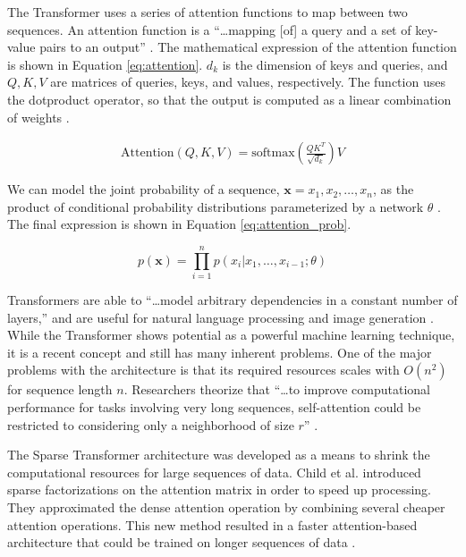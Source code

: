 \documentclass[letterpaper]{article} %
\begin{document}
The Transformer uses a series of attention functions to map
between two sequences.
An attention function is a
``\dots mapping [of] a query and a
set of key-value pairs to an output''
\cite{attention_need}.
The mathematical expression of the attention function is shown in
Equation \ref{eq:attention}.
$d_k$ is the dimension of keys and queries, and
$Q,K,V$ are matrices of queries, keys, and values, respectively.
The function uses the dotproduct operator, so that the output is computed as
a linear combination of weights
\cite{attention_need}.

\begin{equation}
\label{eq:attention}
\begin{split}
\text{Attention}(Q,K,V) = \text{softmax}(\frac{QK^T}{\sqrt{d_k}})V
\end{split}
\end{equation}

We can model the joint probability of a sequence,
$\mathbf{x}={x_1,x_2,\dots,x_n}$,
as the product of conditional
probability distributions parameterized by a network $\theta$
\cite{generative_transformers}.
The final expression is shown in Equation \ref{eq:attention_prob}.

\begin{equation}
\label{eq:attention_prob}
p(\mathbf{x}) = \prod_{i=1}^{n}p(x_i|x_1,\dots,x_{i-1};\theta)
\end{equation}

Transformers are able to
``\dots model arbitrary dependencies
in a constant number of layers,''
and are useful for natural language processing and image generation
\cite{generative_transformers}.
While the Transformer shows potential as a powerful machine learning technique,
it is a recent concept and still has many inherent problems.
One of the major problems with the architecture
is that its required resources scales with $O(n^2)$
for sequence length $n$. Researchers theorize that
``\dots to improve computational performance for tasks involving very long sequences,
self-attention could be restricted to considering only a neighborhood of size $r$''
\cite{attention_need}.

The Sparse Transformer architecture was developed as a means to shrink the
computational resources for large sequences of data.
Child et al. introduced sparse factorizations on the attention matrix
in order to speed up processing.
They approximated the dense attention
operation by combining several cheaper attention operations.
This new method resulted in a faster attention-based architecture
that could be trained on longer sequences of data \cite{generative_transformers}.
\end{document}
